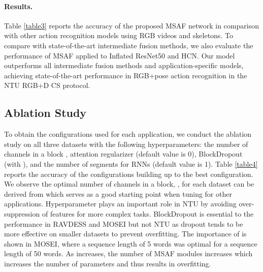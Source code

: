 \documentclass[10pt,twocolumn,letterpaper]{article}
\begin{document}
\paragraph{Results.}
Table \ref{table3} reports the accuracy of the proposed MSAF network in comparison with other action recognition models using RGB videos and skeletons. To compare with state-of-the-art intermediate fusion methods, we also evaluate the performance of MSAF applied to Inflated ResNet50 \cite{Baradel_2018_CVPR} and HCN. Our model outperforms all intermediate fusion methods and application-specific models, achieving state-of-the-art performance in RGB+pose action recognition in the NTU RGB+D CS protocol.

\subsection{Ablation Study}
To obtain the configurations used for each application, we conduct the ablation study on all three datasets with the following hyperparameters: the number of channels in a block , attention regularizer  (default value is 0), BlockDropout (with ), and the number of segments  for RNNs (default value is 1). Table \ref{table4} reports the accuracy of the configurations building up to the best configuration. We observe the optimal number of channels in a block, , for each dataset can be derived from  which serves as a good starting point when tuning  for other applications. Hyperparameter  plays an important role in NTU by avoiding over-suppression of features for more complex tasks. BlockDropout is essential to the performance in RAVDESS and MOSEI but not NTU as dropout tends to be more effective on smaller datasets to prevent overfitting. The importance of  is shown in MOSEI, where a sequence length of 5 words was optimal for a sequence length of 50 words. As  increases, the number of MSAF modules increases which increases the number of parameters and thus results in overfitting.
\end{document}
